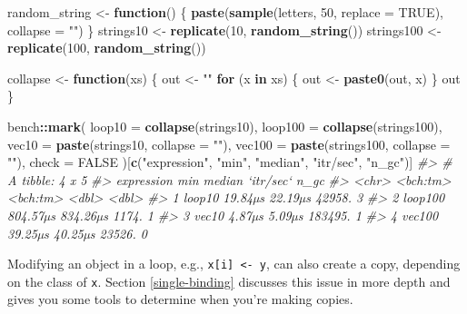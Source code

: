 \documentclass[]{book}
\newenvironment{Shaded}{\begin{snugshade}}{\end{snugshade}}
\newcommand{\CommentTok}[1]{\textcolor[rgb]{0.37,0.37,0.37}{\textit{#1}}}
\newcommand{\ControlFlowTok}[1]{\textcolor[rgb]{0.27,0.27,0.27}{\textbf{#1}}}
\newcommand{\DataTypeTok}[1]{\textcolor[rgb]{0.27,0.27,0.27}{#1}}
\newcommand{\DecValTok}[1]{\textcolor[rgb]{0.06,0.06,0.06}{#1}}
\newcommand{\KeywordTok}[1]{\textcolor[rgb]{0.27,0.27,0.27}{\textbf{#1}}}
\newcommand{\NormalTok}[1]{#1}
\newcommand{\OperatorTok}[1]{\textcolor[rgb]{0.43,0.43,0.43}{\textbf{#1}}}
\newcommand{\OtherTok}[1]{\textcolor[rgb]{0.37,0.37,0.37}{#1}}
\newcommand{\StringTok}[1]{\textcolor[rgb]{0.5,0.5,0.5}{#1}}
\begin{document}
\begin{Shaded}
\begin{Highlighting}[]
\NormalTok{random_string <-}\StringTok{ }\ControlFlowTok{function}\NormalTok{() \{}
  \KeywordTok{paste}\NormalTok{(}\KeywordTok{sample}\NormalTok{(letters, }\DecValTok{50}\NormalTok{, }\DataTypeTok{replace =} \OtherTok{TRUE}\NormalTok{), }\DataTypeTok{collapse =} \StringTok{""}\NormalTok{)}
\NormalTok{\}}
\NormalTok{strings10 <-}\StringTok{ }\KeywordTok{replicate}\NormalTok{(}\DecValTok{10}\NormalTok{, }\KeywordTok{random_string}\NormalTok{())}
\NormalTok{strings100 <-}\StringTok{ }\KeywordTok{replicate}\NormalTok{(}\DecValTok{100}\NormalTok{, }\KeywordTok{random_string}\NormalTok{())}

\NormalTok{collapse <-}\StringTok{ }\ControlFlowTok{function}\NormalTok{(xs) \{}
\NormalTok{  out <-}\StringTok{ ""}
  \ControlFlowTok{for}\NormalTok{ (x }\ControlFlowTok{in}\NormalTok{ xs) \{}
\NormalTok{    out <-}\StringTok{ }\KeywordTok{paste0}\NormalTok{(out, x)}
\NormalTok{  \}}
\NormalTok{  out}
\NormalTok{\}}

\NormalTok{bench}\OperatorTok{::}\KeywordTok{mark}\NormalTok{(}
  \DataTypeTok{loop10  =} \KeywordTok{collapse}\NormalTok{(strings10),}
  \DataTypeTok{loop100 =} \KeywordTok{collapse}\NormalTok{(strings100),}
  \DataTypeTok{vec10   =} \KeywordTok{paste}\NormalTok{(strings10, }\DataTypeTok{collapse =} \StringTok{""}\NormalTok{),}
  \DataTypeTok{vec100  =} \KeywordTok{paste}\NormalTok{(strings100, }\DataTypeTok{collapse =} \StringTok{""}\NormalTok{),}
  \DataTypeTok{check =} \OtherTok{FALSE}
\NormalTok{)[}\KeywordTok{c}\NormalTok{(}\StringTok{"expression"}\NormalTok{, }\StringTok{"min"}\NormalTok{, }\StringTok{"median"}\NormalTok{, }\StringTok{"itr/sec"}\NormalTok{, }\StringTok{"n_gc"}\NormalTok{)]}
\CommentTok{#> # A tibble: 4 x 5}
\CommentTok{#>   expression      min   median `itr/sec`  n_gc}
\CommentTok{#>   <chr>      <bch:tm> <bch:tm>     <dbl> <dbl>}
\CommentTok{#> 1 loop10      19.84µs  22.19µs    42958.     3}
\CommentTok{#> 2 loop100    804.57µs 834.26µs     1174.     1}
\CommentTok{#> 3 vec10        4.87µs   5.09µs   183495.     1}
\CommentTok{#> 4 vec100      39.25µs  40.25µs    23526.     0}
\end{Highlighting}
\end{Shaded}

Modifying an object in a loop, e.g., \texttt{x{[}i{]}\ \textless{}-\ y}, can also create a copy, depending on the class of \texttt{x}. Section \ref{single-binding} discusses this issue in more depth and gives you some tools to determine when you're making copies.
\end{document}
